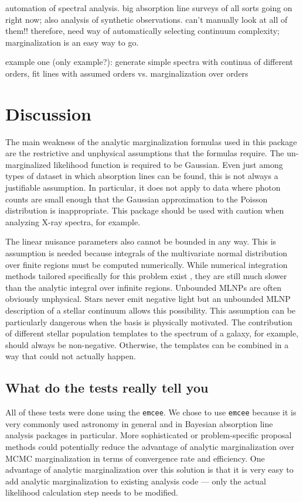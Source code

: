 \documentclass[manuscript]{aastex62}
\begin{document}
automation of spectral analysis.
big absorption line surveys of all sorts going on right now; also analysis of synthetic observations.
can't manually look at all of them!!
therefore, need way of automatically selecting continuum complexity; marginalization is an easy way to go.

example one (only example?): generate simple spectra with continua of different orders, fit lines with assumed orders vs. marginalization over orders

\section{Discussion}
\label{sec:discussion}
The main weakness of the analytic marginalization formulas used in this package are the restrictive and unphysical assumptions that the formulas require.
The un-marginalized likelihood function is required to be Gaussian.
Even just among types of dataset in which absorption lines can be found, this is not always a justifiable assumption.
In particular, it does not apply to data where photon counts are small enough that the Gaussian approximation to the Poisson distribution is inappropriate.
This package should be used with caution when analyzing X-ray spectra, for example.

The linear nuisance parameters also cannot be bounded in any way.
This is assumption is needed because integrals of the multivariate normal distribution over finite regions must be computed numerically.
While numerical integration methods tailored specifically for this problem exist \citep{Genz:2009jp}, they are still much slower than the analytic integral over infinite regions.
Unbounded MLNPs are often obviously unphysical.
Stars never emit negative light but an unbounded MLNP description of a stellar continuum allows this possibility.
This assumption can be particularly dangerous when the basis is physically motivated.
The contribution of different stellar population templates to the spectrum of a galaxy, for example, should always be non-negative.
Otherwise, the templates can be combined in a way that could not actually happen.

\subsection{What do the tests really tell you}

All of these tests were done using the \texttt{emcee}.
We chose to use \texttt{emcee} because it is very commonly used astronomy in general and in Bayesian absorption line analysis packages in particular.
More sophisticated or problem-specific proposal methods could potentially reduce the advantage of analytic marginalization over MCMC marginalization in terms of convergence rate and efficiency.
One advantage of analytic marginalization over this solution is that it is very easy to add analytic marginalization to existing analysis code --- only the actual likelihood calculation step needs to be modified.
\end{document}
